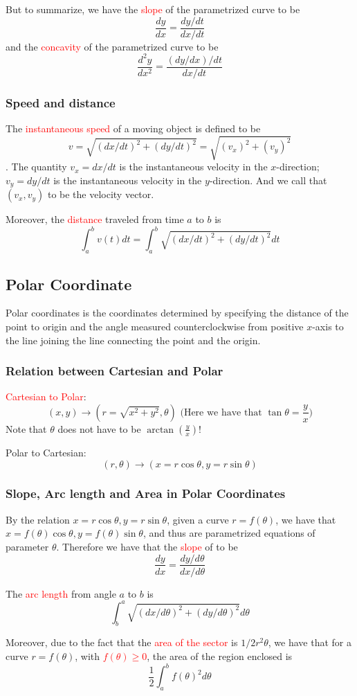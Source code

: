 \documentclass[12pt]{article}
\theoremstyle{definition}
\theoremstyle{definition}
\theoremstyle{remark}
\theoremstyle{definition}
\theoremstyle{definition}
\theoremstyle{definition}
\begin{document}
But to summarize, we have the \textcolor{red}{slope} of the parametrized curve to be 
\[\frac{dy}{dx}=\frac{dy/dt}{dx/dt}\]
and the \textcolor{red}{concavity} of the parametrized curve to be
\[\frac{d^2y}{dx^2}=\frac{(dy/dx)/dt}{dx/dt}\]

\subsubsection{Speed and distance}

The \textcolor{red}{instantaneous speed} of a moving object is defined to be
$$v = \sqrt{(dx/dt)^2 + (dy/dt)^2} =\sqrt{(v_x)^2 + (v_y)^2}$$.
The quantity $v_x = dx/dt$ is the instantaneous velocity in the $x$-direction; $v_y = dy/dt$ is the
instantaneous velocity in the $y$-direction.
And we call that $(v_x,v_y)$ to be the velocity vector.

Moreover, the \textcolor{red}{distance} traveled from time $a$ to $b$ is $$\int^b_a v(t) dt = \int_a^b \sqrt{(dx/dt)^2 + (dy/dt)^2} dt$$

\subsection{Polar Coordinate}

Polar coordinates is the coordinates determined by specifying the distance of the point to origin and the angle measured counterclockwise from positive $x$-axis to the line joining the line connecting the point and the origin.

\subsubsection{Relation between Cartesian and Polar}

\textcolor{red}{Cartesian to Polar}: $$(x,y) \to (r= \sqrt{x^2 + y^2}, \theta) \text{ (Here we have that } \tan \theta = \frac{y}{x} \text{)}$$
Note that $\theta$ does not have to be $\arctan(\frac{y}{x})$!

Polar to Cartesian: $$(r,\theta) \to (x=r \cos \theta, y=r \sin \theta)$$

\subsubsection{Slope, Arc length and Area in Polar Coordinates}

By the relation $x=r \cos \theta, y=r \sin \theta$, given a curve $r=f(\theta)$, we have that $x=f(\theta) \cos \theta, y=f(\theta) \sin \theta$, and thus are parametrized equations of parameter $\theta$. Therefore we have that the \textcolor{red}{slope} of to be 
\[\frac{dy}{dx}=\frac{dy/d\theta}{dx/d\theta}\]

The \textcolor{red}{arc length} from angle $a$ to $b$ is $$\int_b^a \sqrt{(dx/d\theta)^2 + (dy/d\theta)^2} d\theta$$

Moreover, due to the fact that the \textcolor{red}{area of the sector} is $1/2 r^2 \theta$, we have that for a curve $r = f(\theta)$, with \textcolor{red}{$f(\theta) \geq 0$}, the area of the region enclosed is $$\frac{1}{2}\int^{b}_{a}f(\theta)^2 d\theta$$
\end{document}
